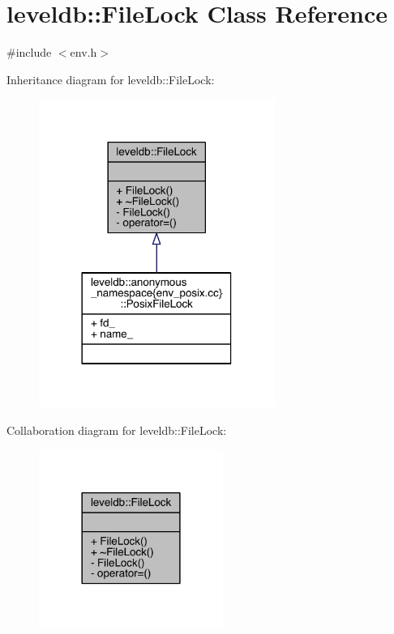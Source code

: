 \hypertarget{classleveldb_1_1_file_lock}{}\section{leveldb\+:\+:File\+Lock Class Reference}
\label{classleveldb_1_1_file_lock}


{\ttfamily \#include $<$env.\+h$>$}



Inheritance diagram for leveldb\+:\+:File\+Lock\+:
\nopagebreak
\begin{figure}[H]
\begin{center}
\leavevmode
\includegraphics[width=218pt]{classleveldb_1_1_file_lock__inherit__graph}
\end{center}
\end{figure}


Collaboration diagram for leveldb\+:\+:File\+Lock\+:\nopagebreak
\begin{figure}[H]
\begin{center}
\leavevmode
\includegraphics[width=170pt]{classleveldb_1_1_file_lock__coll__graph}
\end{center}
\end{figure}

